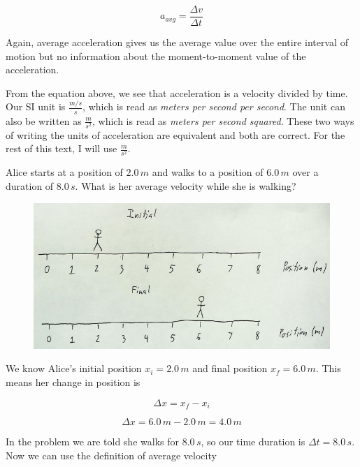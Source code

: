 \documentclass[12pt]{book}
\begin{document}
\begin{equation}
a_{avg} = \frac{\Delta v}{\Delta t}
\end{equation}

Again, average acceleration gives us the average value over the entire interval of motion but no information about the moment-to-moment value of the acceleration.

From the equation above, we see that acceleration is a velocity divided by time. Our SI unit is $\frac{m/s}{s}$, which is read as \textit{meters per second per second}. The unit can also be written as $\frac{m}{s^2}$, which is read as \textit{meters per second squared}. These two ways of writing the units of acceleration are equivalent and both are correct. For the rest of this text, I will use $\frac{m}{s^2}$.

\begin{exampleblock}

Alice starts at a position of $2.0 \, m$ and walks to a position of $6.0 \, m$ over a duration of $8.0 \, s$. What is her average velocity while she is walking?

\begin{figure}[h]
\centering
\includegraphics[scale=0.8]{example_units_velocity_walking.png}
\end{figure}

We know Alice's initial position $x_i = 2.0 \, m$ and final position $x_f = 6.0 \, m$. This means her change in position is

\begin{equation}
\Delta x = x_f - x_i
\end{equation}

\begin{equation}
\Delta x = 6.0 \, m - 2.0 \, m = 4.0 \, m
\end{equation}

In the problem we are told she walks for $8.0 \, s$, so our time duration is $\Delta t = 8.0 \, s$. Now we can use the definition of average velocity


\end{exampleblock}
\end{document}
